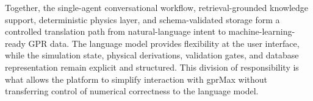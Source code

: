 \documentclass[journal]{IEEEtran}
\begin{document}
Together, the single-agent conversational workflow, retrieval-grounded knowledge support, deterministic physics layer, and schema-validated storage form a controlled translation path from natural-language intent to machine-learning-ready GPR data. The language model provides flexibility at the user interface, while the simulation state, physical derivations, validation gates, and database representation remain explicit and structured. This division of responsibility is what allows the platform to simplify interaction with gprMax without transferring control of numerical correctness to the language model.








\end{document}
